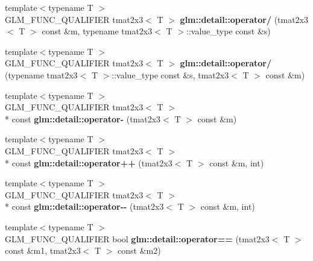 \begin{DoxyCompactItemize}
\item 
\hypertarget{namespaceglm_1_1detail_a5e6a803b33f653dc85fb09e2e4d3d68b}{{\footnotesize template$<$typename T $>$ }\\G\-L\-M\-\_\-\-F\-U\-N\-C\-\_\-\-Q\-U\-A\-L\-I\-F\-I\-E\-R tmat2x3$<$ T $>$ {\bfseries glm\-::detail\-::operator/} (tmat2x3$<$ T $>$ const \&m, typename tmat2x3$<$ T $>$\-::value\-\_\-type const \&s)}\label{namespaceglm_1_1detail_a5e6a803b33f653dc85fb09e2e4d3d68b}

\item 
\hypertarget{namespaceglm_1_1detail_a11c49bf431886b417faeb5894d72c512}{{\footnotesize template$<$typename T $>$ }\\G\-L\-M\-\_\-\-F\-U\-N\-C\-\_\-\-Q\-U\-A\-L\-I\-F\-I\-E\-R tmat2x3$<$ T $>$ {\bfseries glm\-::detail\-::operator/} (typename tmat2x3$<$ T $>$\-::value\-\_\-type const \&s, tmat2x3$<$ T $>$ const \&m)}\label{namespaceglm_1_1detail_a11c49bf431886b417faeb5894d72c512}

\item 
\hypertarget{namespaceglm_1_1detail_a03176ecd956bcab7d0c42a6356c6926c}{{\footnotesize template$<$typename T $>$ }\\G\-L\-M\-\_\-\-F\-U\-N\-C\-\_\-\-Q\-U\-A\-L\-I\-F\-I\-E\-R tmat2x3$<$ T $>$\\*
 const {\bfseries glm\-::detail\-::operator-\/} (tmat2x3$<$ T $>$ const \&m)}\label{namespaceglm_1_1detail_a03176ecd956bcab7d0c42a6356c6926c}

\item 
\hypertarget{namespaceglm_1_1detail_a2c6bdfdc257101b34a881301be5de303}{{\footnotesize template$<$typename T $>$ }\\G\-L\-M\-\_\-\-F\-U\-N\-C\-\_\-\-Q\-U\-A\-L\-I\-F\-I\-E\-R tmat2x3$<$ T $>$\\*
 const {\bfseries glm\-::detail\-::operator++} (tmat2x3$<$ T $>$ const \&m, int)}\label{namespaceglm_1_1detail_a2c6bdfdc257101b34a881301be5de303}

\item 
\hypertarget{namespaceglm_1_1detail_a63ebd9a1a6fc2a74617e8d5d09d9b40f}{{\footnotesize template$<$typename T $>$ }\\G\-L\-M\-\_\-\-F\-U\-N\-C\-\_\-\-Q\-U\-A\-L\-I\-F\-I\-E\-R tmat2x3$<$ T $>$\\*
 const {\bfseries glm\-::detail\-::operator-\/-\/} (tmat2x3$<$ T $>$ const \&m, int)}\label{namespaceglm_1_1detail_a63ebd9a1a6fc2a74617e8d5d09d9b40f}

\item 
\hypertarget{namespaceglm_1_1detail_ada047383848239b91e1adb9eda99b519}{{\footnotesize template$<$typename T $>$ }\\G\-L\-M\-\_\-\-F\-U\-N\-C\-\_\-\-Q\-U\-A\-L\-I\-F\-I\-E\-R bool {\bfseries glm\-::detail\-::operator==} (tmat2x3$<$ T $>$ const \&m1, tmat2x3$<$ T $>$ const \&m2)}\label{namespaceglm_1_1detail_ada047383848239b91e1adb9eda99b519}


\end{DoxyCompactItemize}
